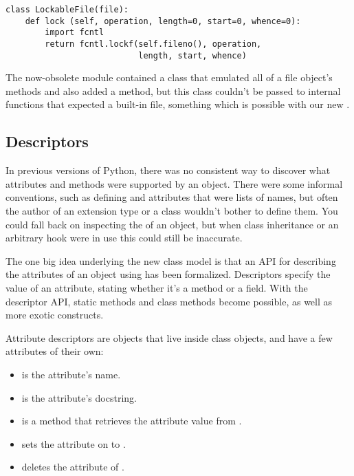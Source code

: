 \documentclass{howto}
\begin{document}
\begin{verbatim}
class LockableFile(file):
    def lock (self, operation, length=0, start=0, whence=0):
        import fcntl
        return fcntl.lockf(self.fileno(), operation,
                           length, start, whence)
\end{verbatim}

The now-obsolete  module contained a class that
emulated all of a file object's methods and also added a
 method, but this class couldn't be passed to internal
functions that expected a built-in file, something which is possible
with our new .


\subsection{Descriptors}

In previous versions of Python, there was no consistent way to
discover what attributes and methods were supported by an object.
There were some informal conventions, such as defining
 and  attributes that were
lists of names, but often the author of an extension type or a class
wouldn't bother to define them.  You could fall back on inspecting the
 of an object, but when class inheritance or an
arbitrary  hook were in use this could still be
inaccurate.

The one big idea underlying the new class model is that an API for
describing the attributes of an object using  has
been formalized.  Descriptors specify the value of an attribute,
stating whether it's a method or a field.  With the descriptor API,
static methods and class methods become possible, as well as more
exotic constructs.

Attribute descriptors are objects that live inside class objects, and
have a few attributes of their own:

\begin{itemize}

\item {} is the attribute's name.

\item {} is the attribute's docstring.

\item {} is a method that retrieves the
attribute value from . 

\item {} sets the attribute
on  to .

\item {} deletes the  
attribute of .
\end{itemize}
\end{document}
